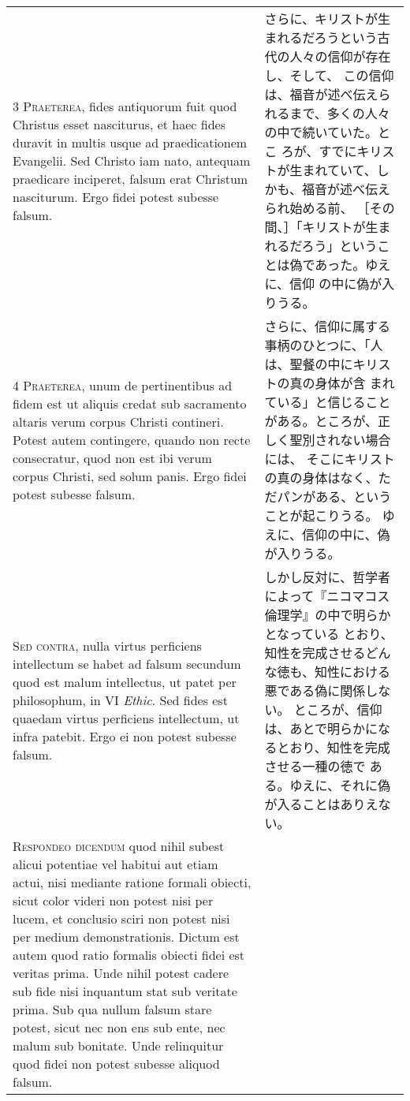 \documentclass[10pt]{jsarticle} %
\begin{document}
\begin{longtable}{p{21em}p{21em}}
\\


{\scshape 3 Praeterea}, fides antiquorum fuit quod
Christus esset nasciturus, et haec fides duravit in multis usque ad
praedicationem Evangelii. Sed Christo iam nato, antequam praedicare
inciperet, falsum erat Christum nasciturum. Ergo fidei potest subesse
falsum.


&

さらに、キリストが生まれるだろうという古代の人々の信仰が存在し、そして、
 この信仰は、福音が述べ伝えられるまで、多くの人々の中で続いていた。とこ
 ろが、すでにキリストが生まれていて、しかも、福音が述べ伝えられ始める前、
［その間、］「キリストが生まれるだろう」ということは偽であった。ゆえに、信仰
 の中に偽が入りうる。

\\


{\scshape 4 Praeterea}, unum de pertinentibus ad
fidem est ut aliquis credat sub sacramento altaris verum corpus Christi
contineri. Potest autem contingere, quando non recte consecratur, quod
non est ibi verum corpus Christi, sed solum panis. Ergo fidei potest
subesse falsum.


&

さらに、信仰に属する事柄のひとつに、「人は、聖餐の中にキリストの真の身体が含
 まれている」と信じることがある。ところが、正しく聖別されない場合には、
 そこにキリストの真の身体はなく、ただパンがある、ということが起こりうる。
 ゆえに、信仰の中に、偽が入りうる。

\\


{\scshape  Sed contra}, nulla virtus perficiens
intellectum se habet ad falsum secundum quod est malum intellectus, ut
patet per philosophum, in VI {\itshape Ethic}. Sed fides est quaedam virtus
perficiens intellectum, ut infra patebit. Ergo ei non potest subesse
falsum.


&

しかし反対に、哲学者によって『ニコマコス倫理学』の中で明らかとなっている
 とおり、知性を完成させるどんな徳も、知性における悪である偽に関係しない。
 ところが、信仰は、あとで明らかになるとおり、知性を完成させる一種の徳で
 ある。ゆえに、それに偽が入ることはありえない。

\\


{\scshape Respondeo dicendum} quod nihil subest
alicui potentiae vel habitui aut etiam actui, nisi mediante ratione
formali obiecti, sicut color videri non potest nisi per lucem, et
conclusio sciri non potest nisi per medium demonstrationis. Dictum est
autem quod ratio formalis obiecti fidei est veritas prima. Unde nihil
potest cadere sub fide nisi inquantum stat sub veritate prima. Sub qua
nullum falsum stare potest, sicut nec non ens sub ente, nec malum sub
bonitate. Unde relinquitur quod fidei non potest subesse aliquod falsum.


\end{longtable}
\end{document}
